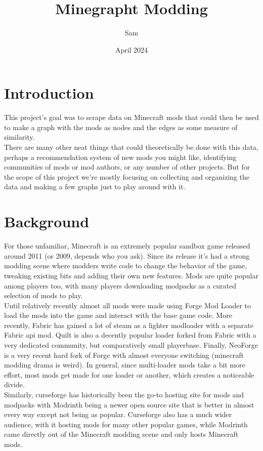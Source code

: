 \documentclass[a4paper,11pt, twocolumn]{article}
\title{Minegrapht Modding}
\date{April 2024}
\author{Sam}
\begin{document}
\maketitle

\section{Introduction}
This project's goal was to scrape data on Minecraft mods that could then be used to make a graph with the mods as nodes and the edges as some measure of similarity.\\

There are many other neat things that could theoretically be done with this data, perhaps a recommendation system of new mods you might like, identifying communities of mods or mod authors, or any number of other projects. But for the scope of this project we're mostly focusing on collecting and organizing the data and making a few graphs just to play around with it.

\section{Background}

For those unfamiliar, Minecraft is an extremely popular sandbox game released around 2011 (or 2009, depends who you ask). Since its release it's had a strong modding scene where modders write code to change the behavior of the game, tweaking existing bits and adding their own new features. Mods are quite popular among players too, with many players downloading modpacks as a curated selection of mods to play.\\

Until relatively recently almost all mods were made using Forge Mod Loader to load the mods into the game and interact with the base game code. More recently, Fabric has gained a lot of steam as a lighter modloader with a separate Fabric api mod. Quilt is also a decently popular loader forked from Fabric with a very dedicated community, but comparatively small playerbase. Finally, NeoForge is a very recent hard fork of Forge with almost everyone switching (minecraft modding drama is weird). In general, since multi-loader mods take a bit more effort, most mods get made for one loader or another, which creates a noticeable divide.\\

Similarly, curseforge has historically been the go-to hosting site for mods and modpacks with Modrinth being a newer open source site that is better in almost every way except not being as popular. Curseforge also has a much wider audience, with it hosting mods for many other popular games, while Modrinth came directly out of the Minecraft modding scene and only hosts Minecraft mods.\\
\end{document}
